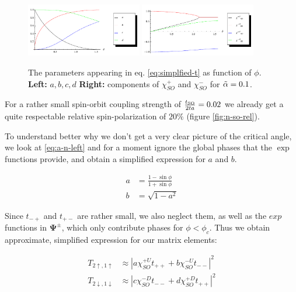 \begin{figure}
    \begin{center}
        \includegraphics[width=0.45\textwidth]{parameters-abcd.pdf}%
        \hspace{0.05\textwidth}%
        \includegraphics[width=0.45\textwidth]{parameters-chi.pdf}
    \end{center}
    \caption{The parameters appearing in eq. \ref{eq:simplfied-t} as function
        of $\phi$. \textbf{Left: } $a, b, c, d$ \textbf{Right: } components of
            $\chi_{SO}^+$ and $\chi_{SO}^-$ for $\tilde \alpha = 0.1$.}
    \label{fig:simplfieid-parmas}
\end{figure}

For a rather small spin-orbit coupling strength of $\frac{t_{\textnormal{SO}}}{2 t a} = 0.02$
we already get a quite respectable relative spin-polarization of $20\%$
(figure \ref{fig:n-so-rel}).

To understand better why we don't get a very clear picture of the critical
angle, we look at \ref{eq:a-n-left} and for a moment
ignore the global phases that the $\exp$ functions provide, and obtain a
simplified expression for $a$ and $b$.


\begin{align}
   a &= \frac{1-\sin \phi}{1 + \sin\phi} \nonumber\\
   b &= \sqrt{1-a^2}
\end{align}

Since $t_{-+}$ and $t_{+-}$ are rather small, we also neglect them, as well as
the $exp$ functions in $\mathbf{\Psi^\pm}$, which only contribute phases for
$\phi < \phi_c$. Thus we obtain approximate, 
simplified expression for our matrix elements:

\begin{align}
    T_{2\uparrow,1\uparrow}     &\approx \left|a \chi_{SO}^{+U} t_{++}
            + b \chi_{SO}^{-U} t_{--} \right|^2\nonumber\\
    T_{2\downarrow,1\downarrow} &\approx \left|c \chi_{SO}^{-D} t_{--}
            + d \chi_{SO}^{+D} t_{++} \right|^2
    \label{eq:simplfied-t}
\end{align}

